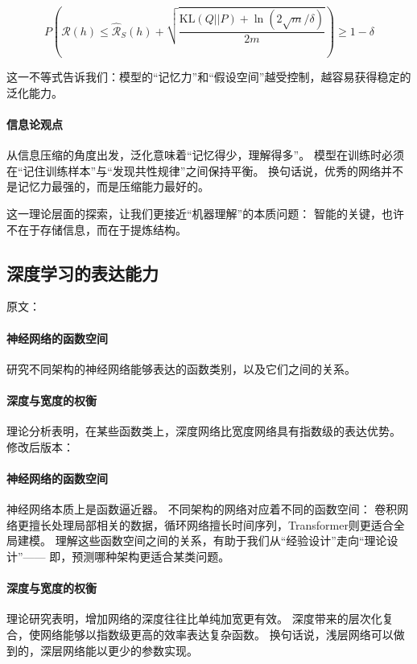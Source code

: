 $$
P\left(\mathcal{R}(h) \leq \hat{\mathcal{R}}_S(h) + 
\sqrt{\frac{\text{KL}(Q||P) + \ln(2\sqrt{m}/\delta)}{2m}}
\right) \geq 1-\delta
$$

这一不等式告诉我们：模型的“记忆力”和“假设空间”越受控制，越容易获得稳定的泛化能力。

\paragraph{信息论观点}  
从信息压缩的角度出发，泛化意味着“记忆得少，理解得多”。  
模型在训练时必须在“记住训练样本”与“发现共性规律”之间保持平衡。  
换句话说，优秀的网络并不是记忆力最强的，而是压缩能力最好的。  

这一理论层面的探索，让我们更接近“机器理解”的本质问题：  
智能的关键，也许不在于存储信息，而在于提炼结构。



\subsection{深度学习的表达能力}

原文：
\paragraph{神经网络的函数空间}
研究不同架构的神经网络能够表达的函数类别，以及它们之间的关系。

\paragraph{深度与宽度的权衡}
理论分析表明，在某些函数类上，深度网络比宽度网络具有指数级的表达优势。
修改后版本：
\paragraph{神经网络的函数空间}  
神经网络本质上是函数逼近器。  
不同架构的网络对应着不同的函数空间：  
卷积网络更擅长处理局部相关的数据，循环网络擅长时间序列，Transformer则更适合全局建模。  
理解这些函数空间之间的关系，有助于我们从“经验设计”走向“理论设计”——  
即，预测哪种架构更适合某类问题。

\paragraph{深度与宽度的权衡}  
理论研究表明，增加网络的深度往往比单纯加宽更有效。  
深度带来的层次化复合，使网络能够以指数级更高的效率表达复杂函数。  
换句话说，浅层网络可以做到的，深层网络能以更少的参数实现。  

